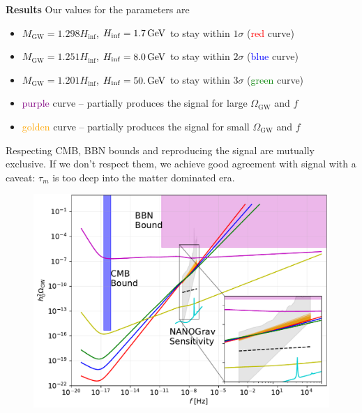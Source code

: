 \documentclass{beamer}                             %
\newcommand{\blocktitle}[1]{{\Large \textbf{#1}}}
\newcommand{\GeV}{\,{\rm GeV}}
\begin{document}
\begin{frame}[t]
\begin{columns}[T]
\begin{column}{0.30\textwidth}
    \begin{tcolorbox}
    \blocktitle{Results}
    Our values for the parameters are 
    \begin{itemize}
        \item $M_{\text{GW}} = 1.298H_{\inf}$, $H_{\inf} =  1.7 \GeV$ to stay within $1\sigma$ (\textcolor{red}{red} curve)
        \item $M_{\text{GW}} = 1.251H_{\inf}$, $H_{\inf} = 8.0 \GeV$ to stay within $2\sigma$ (\textcolor{blue}{blue} curve)
        \item $M_{\text{GW}} = 1.201H_{\inf}$, $H_{\inf} = 50. \GeV$ to stay within $3\sigma$ (\textcolor{green}{green} curve)
        \item \textcolor{purple}{purple} curve -- partially produces the signal for large $\Omega_{\text{GW}}$ and $f$
        \item \textcolor{orange}{golden} curve -- partially produces the signal for small $\Omega_{\text{GW}}$ and $f$
    \end{itemize}
   Respecting CMB, BBN bounds and reproducing the signal are mutually exclusive. If we don't respect them, we achieve good agreement with signal with a caveat: $\tau_m$ is too deep into the matter dominated era.
   \vspace{-0cm}
     \begin{figure}[t]
        \centering
          \includegraphics[width=.9\linewidth]{fig5-cropped.pdf} 

          \label{fig:contours}
        \end{figure}
  \end{tcolorbox}
  
\end{column}


\end{columns}
\end{frame}
\end{document}
